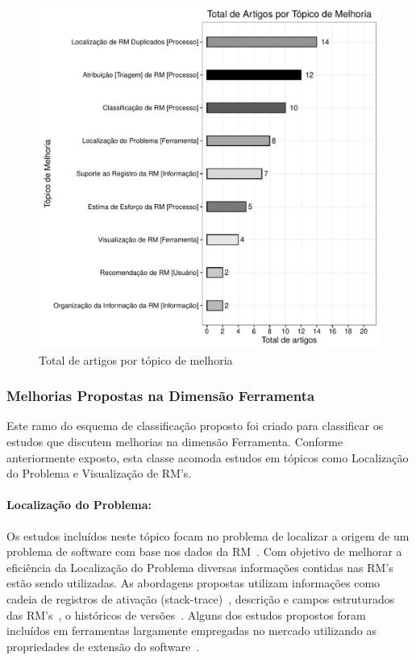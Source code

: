 \begin{figure}[htpb] \centering
	\includegraphics[width=0.7\linewidth]{./chapter-mapeamento-sistematico/img/grafico_topico_por_artigo.pdf}
	\caption{Total de artigos por tópico de melhoria}
	\label{fig:grafico_topico_por_artigo} \end{figure}

\subsubsection{Melhorias Propostas na Dimensão Ferramenta}
\label{ssub:melhorias_dim_ferramenta}

Este ramo do esquema de classificação proposto foi criado para classificar os
estudos que discutem melhorias na dimensão Ferramenta. Conforme anteriormente
exposto, esta classe acomoda estudos em tópicos como Localização do Problema e
Visualização de RM's.

\paragraph{Localização do Problema:} Os estudos incluídos neste tópico focam no
problema de localizar a origem de um problema de software com base nos dados da
RM~\cite{Hovemeyer:2004:FBE:1052883.1052895}. Com objetivo de melhorar a
eficiência da Localização do Problema diversas informações contidas nas RM's
estão sendo utilizadas. As abordagens propostas utilizam informações como cadeia
de registros de ativação (stack-trace)~\cite{Wong:2014:BBF:2705615.2706096},
des\-cri\-ção e campos estruturados das
RM's~\cite{Thung:2014:BIT:2635868.2661678}, o históricos de
versões~\cite{Bangcharoensap:2012:LSC:2419061.2419428,corley2011recovering,Romo:2015:TAT:2745802.2745833}.
Alguns dos estudos propostos foram incluídos em ferramentas largamente
empregadas no mercado utilizando as propriedades de extensão do
software~\cite{Thung:2014:BIT:2635868.2661678,corley2011recovering}.

